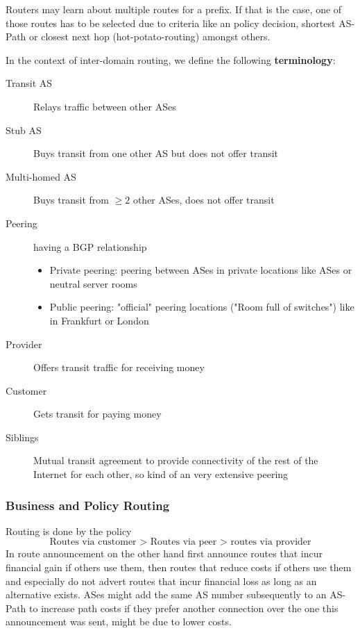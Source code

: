 Routers may learn about multiple routes for a prefix.
If that is the case, one of those routes has to be selected due to criteria like an policy decision, shortest AS-Path or closest next hop (hot-potato-routing) amongst others.\\
\vspace{5pt}

In the context of inter-domain routing, we define the following \textbf{terminology}:
\begin{description}
  \item[Transit AS] Relays traffic between other ASes
  \item[Stub AS] Buys transit from one other AS but does not offer transit
  \item[Multi-homed AS] Buys transit from $\geq 2$ other ASes, does not offer transit
  \item[Peering] having a BGP relationship
    \begin{itemize}
      \item Private peering: peering between ASes in private locations like ASes or neutral server rooms
      \item Public peering: "official" peering locations ("Room full of switches") like in Frankfurt or London
    \end{itemize}
  \item[Provider] Offers transit traffic for receiving money
  \item[Customer] Gets transit for paying money
  \item[Siblings] Mutual transit agreement to provide connectivity of the rest of the Internet for each other, so kind of an very extensive peering
\end{description}

\subsubsection*{Business and Policy Routing}
Routing is done by the policy
\begin{equation*}
  \text{Routes via customer > Routes via peer > routes via provider}
\end{equation*}
In route announcement on the other hand first announce routes that incur financial gain if others use them, then routes that reduce costs if others use them and especially do not advert routes that incur financial loss as long as an alternative exists.
ASes might add the same AS number subsequently to an AS-Path to increase path costs if they prefer another connection over the one this announcement was sent, might be due to lower costs.

